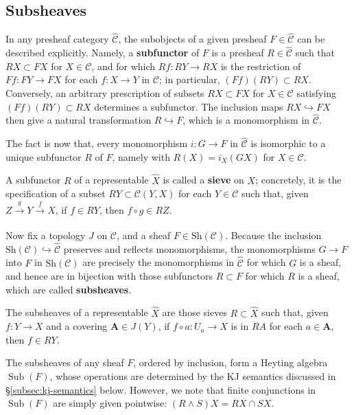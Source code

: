 \documentclass[11pt]{amsart}
\newcommand\bA{\mathbf{A}}
\newcommand\cC{\mathcal{C}}
\newcommand\defword[1]{\textbf{#1}}
\newcommand\hto{\hookrightarrow}
\newcommand\Sh{\mathrm{Sh}}
\newcommand\Sub{\operatorname{Sub}}
\newcommand\tox[2][]{\xrightarrow[#1]{#2}}
\newcommand\wh[1]{\widehat{#1}}
\theoremstyle{definition}
\theoremstyle{remark}
\theoremstyle{plain}
\begin{document}
\subsection{Subsheaves}\label{subsec:subsheaves}
In any presheaf category \( \wh{\cC} \), the subobjects of a given presheaf \( F \in \wh{\cC} \) can be described explicitly.
Namely, a \defword{subfunctor} of \( F \) is a presheaf \( R \in \wh{\cC} \) such that \( R X \subset F X \) for \( X \in \cC \), and for which \( R f \colon R Y \to R X \) is the restriction of \( F f \colon F Y \to F X \) for each \( f \colon X \to Y \) in \( \cC \); in particular, \( (F f) (R Y) \subset R X \).
Conversely, an arbitrary prescription of subsets \( R X \subset F X \) for \( X \in \cC \) satisfying \( (F f) (R Y) \subset R X \) determines a subfunctor.
The inclusion maps \( R X \hto F X \) then give a natural transformation \( R \hto F \), which is a monomorphism in \( \wh{\cC} \).

The fact is now that, every monomorphism \( i \colon G \to F \) in \( \wh{\cC} \) is isomorphic to a unique subfunctor \( R \) of \( F \), namely with \( R(X) = i_X(G X) \) for \( X \in \cC \).

A subfunctor \( R \) of a representable \( \wh{X} \) is called a \defword{sieve} on \( X \); concretely, it is the specification of a subset \( R Y \subset \cC(Y,X) \) for each \( Y \in \cC \) such that, given \( Z \tox{g} Y \tox{f} X \), if \( f \in R Y \), then \( f \circ g \in R Z \).

Now fix a topology \( J \) on \( \cC \), and a sheaf \( F \in \Sh(\cC) \).
Because the inclusion \( \Sh(\cC) \hto \wh{\cC} \) preserves and reflects monomorphisms, the monomorphisms \( G \to F \) into \( F \) in \( \Sh(\cC) \) are precisely the monomorphisms in \( \wh{\cC} \) for which \( G \) is a sheaf, and hence are in bijection with those subfunctors \( R \subset F \) for which \( R \) is a sheaf, which are called \defword{subsheaves}.

The subsheaves of a representable \( \wh{X} \) are those sieves \( R \subset \wh{X} \) such that, given \( f \colon Y \to X \) and a covering \( \bA \in J(Y) \), if \( f \circ a \colon U_a \to X \) is in \( R A \) for each \( a \in \bA \), then \( f \in R Y \).

The subsheaves of any sheaf \( F \), ordered by inclusion, form a Heyting algebra \( \Sub(F) \), whose operations are determined by the KJ semantics discussed in \S\ref{subsec:kj-semantics} below.
However, we note that finite conjunctions in \( \Sub(F) \) are simply given pointwise: \( (R \wedge S) X = R X \cap S X \).
\end{document}
